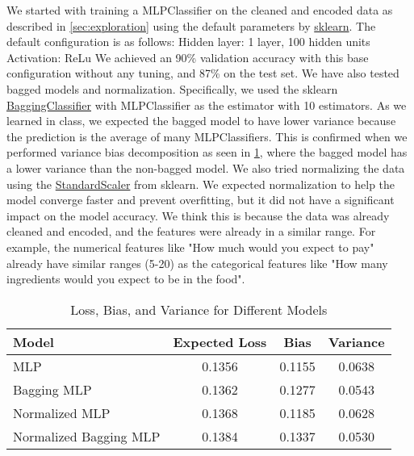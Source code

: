 \begin{itemize}
We started with training a MLPClassifier on the cleaned and encoded data as described in \ref{sec:exploration} using the default parameters by 
\href{https://scikit-learn.org/stable/modules/generated/sklearn.neural_network.MLPClassifier.html}{sklearn}. 
The default configuration is as follows:
Hidden layer: 1 layer, 100 hidden units
Activation: ReLu
We achieved an 90\% validation accuracy with this base configuration without any tuning, and 87\% on the test set.
We have also tested bagged models and normalization. Specifically, we used the sklearn \href{https://scikit-learn.org/stable/modules/generated/sklearn.ensemble.BaggingClassifier.html}{BaggingClassifier} 
with MLPClassifier as the estimator with 10 estimators. As we learned in class, we expected the bagged model to have lower variance because the prediction is the average of many MLPClassifiers. 
This is confirmed when we performed variance bias decomposition as seen in \ref{tab:nn_bias_var}, where the bagged model has a lower variance than the non-bagged model.
We also tried normalizing the data using the \href{https://scikit-learn.org/stable/modules/generated/sklearn.preprocessing.StandardScaler.html}{StandardScaler} from sklearn.
We expected normalization to help the model converge faster and prevent overfitting, but it did not have a significant impact on the model accuracy.
We think this is because the data was already cleaned and encoded, and the features were already in a similar range. 
For example, the numerical features like "How much would you expect to pay" already have similar ranges (5-20) as the categorical features like "How many ingredients would you expect to be in the food".

\begin{table}[ht]
    \centering
    \begin{tabular}{lccc}
        \hline
        Model                     & Expected Loss & Bias   & Variance \\ 
        \hline
        MLP                       & 0.1356        & 0.1155 & 0.0638   \\
        Bagging MLP               & 0.1362        & 0.1277 & 0.0543   \\
        Normalized MLP            & 0.1368        & 0.1185 & 0.0628   \\
        Normalized Bagging MLP    & 0.1384        & 0.1337 & 0.0530   \\
        \hline
    \end{tabular}
    \caption{Loss, Bias, and Variance for Different Models}
    \label{tab:nn_bias_var}
\end{table}


\end{itemize}
